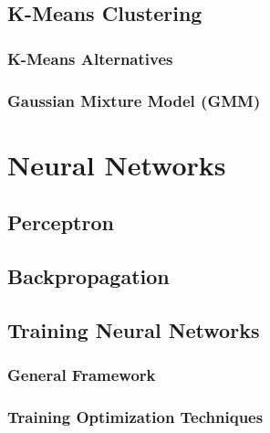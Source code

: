 \documentclass[
]{book}
\begin{document}
\hypertarget{k-means-clustering}{%
\subsection{K-Means Clustering}\label{k-means-clustering}}

\hypertarget{k-means-alternatives}{%
\subsubsection{K-Means Alternatives}\label{k-means-alternatives}}

\hypertarget{gaussian-mixture-model-gmm}{%
\subsubsection{Gaussian Mixture Model (GMM)}\label{gaussian-mixture-model-gmm}}

\hypertarget{neural-networks}{%
\section{Neural Networks}\label{neural-networks}}

\hypertarget{perceptron}{%
\subsection{Perceptron}\label{perceptron}}

\hypertarget{backpropagation}{%
\subsection{Backpropagation}\label{backpropagation}}

\hypertarget{training-neural-networks}{%
\subsection{Training Neural Networks}\label{training-neural-networks}}

\hypertarget{general-framework-1}{%
\subsubsection{General Framework}\label{general-framework-1}}

\hypertarget{training-optimization-techniques}{%
\subsubsection{Training Optimization Techniques}\label{training-optimization-techniques}}
\end{document}
